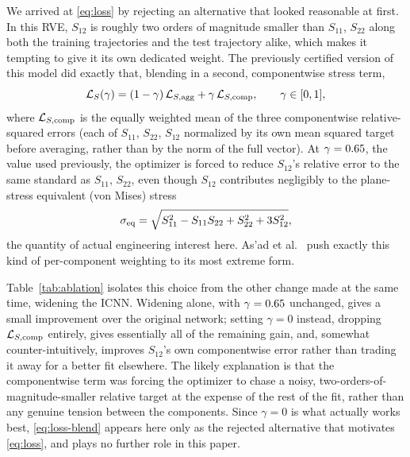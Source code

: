 \documentclass[10pt,a4paper]{article}
\begin{document}
We arrived at \eqref{eq:loss} by rejecting an alternative that looked
reasonable at first. In this RVE, $S_{12}$ is roughly two orders of
magnitude smaller than $S_{11}$, $S_{22}$ along both the training
trajectories and the test trajectory alike, which makes it
tempting to give it its own dedicated weight. The previously certified
version of this model did exactly that, blending in a second,
componentwise stress term,
\begin{equation}
 \mathcal L_S(\gamma)=(1-\gamma)\,\mathcal L_{S,\rm agg}+\gamma\,\mathcal L_{S,\rm comp},
 \qquad \gamma\in[0,1],
 \label{eq:loss-blend}
\end{equation}
where $\mathcal L_{S,\rm comp}$ is the equally weighted mean of the
three componentwise relative-squared errors (each of $S_{11}$,
$S_{22}$, $S_{12}$ normalized by its own mean squared target before
averaging, rather than by the norm of the full vector). At
$\gamma=0.65{}$, the value used previously, the
optimizer is forced to reduce $S_{12}$'s relative error to the same
standard as $S_{11}$, $S_{22}$, even though $S_{12}$ contributes
negligibly to the plane-stress equivalent (von Mises) stress
\begin{equation}
 \sigma_{\rm eq}=\sqrt{S_{11}^2-S_{11}S_{22}+S_{22}^2+3S_{12}^2},
 \label{eq:von-mises}
\end{equation}
the quantity of actual engineering interest here. As'ad et
al.~\cite{Asad2022} push exactly this kind of per-component weighting to
its most extreme form.

Table~\ref{tab:ablation} isolates this choice from the other change made
at the same time, widening the ICNN. Widening alone, with
$\gamma=0.65{}$ unchanged, gives a small
improvement over the original network; setting $\gamma=0$ instead,
dropping $\mathcal L_{S,\rm comp}$ entirely, gives essentially all of
the remaining gain, and, somewhat counter-intuitively, improves
$S_{12}$'s own componentwise error rather than trading it away for a
better fit elsewhere. The likely explanation is that the componentwise
term was forcing the optimizer to chase a noisy, two-orders-of-magnitude-smaller
relative target at the expense of the rest of the fit, rather than any
genuine tension between the components. Since $\gamma=0$ is what
actually works best, \eqref{eq:loss-blend} appears here only as the
rejected alternative that motivates \eqref{eq:loss}, and plays no
further role in this paper.
\end{document}
